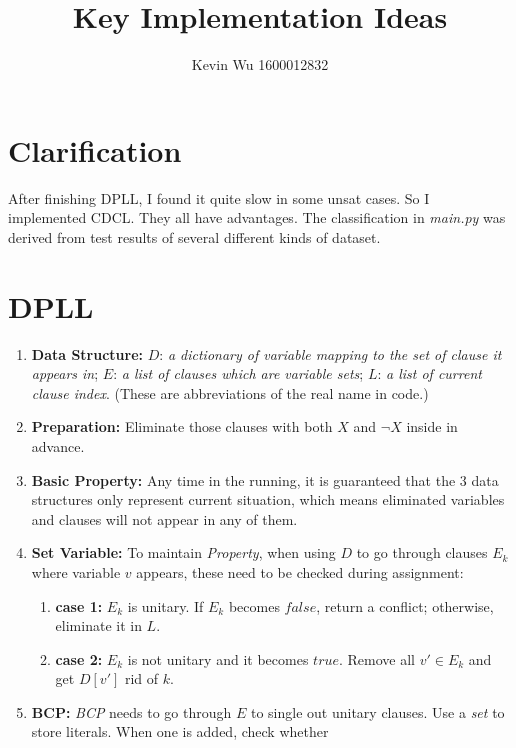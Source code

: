 \documentclass[a4paper,10pt]{article}
\title{Key Implementation Ideas}
\author{Kevin Wu 1600012832}
\date{}
\begin{document}
\maketitle
\vspace{-20pt}
\section{Clarification}
After finishing DPLL, I found it quite slow in some unsat cases. So I implemented CDCL. They all have advantages. The classification in \textit{main.py} was derived from test results of several different kinds of dataset.
\vspace{-5pt}
\section{DPLL}
\begin{enumerate}
\setlength{\itemsep}{.1em}
\item \textbf{Data Structure:} $D$:
    \textit{a dictionary of variable mapping to the set of clause it appears in}; $E$:
    \textit{a list of clauses which are variable sets}; $L$: \textit{a list of current
    clause index}. (These are abbreviations of the real name in code.)
\item \textbf{Preparation:}
    Eliminate those clauses with both $X$ and $\neg X$ inside in advance.
\item \textbf{Basic Property:} Any time in the running, it is guaranteed
    that the $3$ data structures
    only represent current situation, which means eliminated variables and 
    clauses will not appear in any of them.
\item \textbf{Set Variable:} To maintain \textit{Property}, when using $D$ to go through
    clauses $E_k$ where variable $v$ appears, these need to be checked during assignment:
    \vspace{-5pt}
    \begin{enumerate}
        \small\setlength{\itemsep}{.1em}
        \item \textbf{case 1:} $E_k$ is unitary. If $E_k$ becomes $false$, return a conflict; otherwise, eliminate it in $L$.
        \item \textbf{case 2:} $E_k$ is not unitary and it becomes $true$. Remove all $v'\in E_k$ and get $D[v']$ rid of $k$.
    \end{enumerate}
\item \textbf{BCP:} \textit{BCP} needs to go through $E$ to single out unitary 
    clauses. Use a \textit{set} to store literals. When one is added, check whether 

\end{enumerate}
\end{document}
